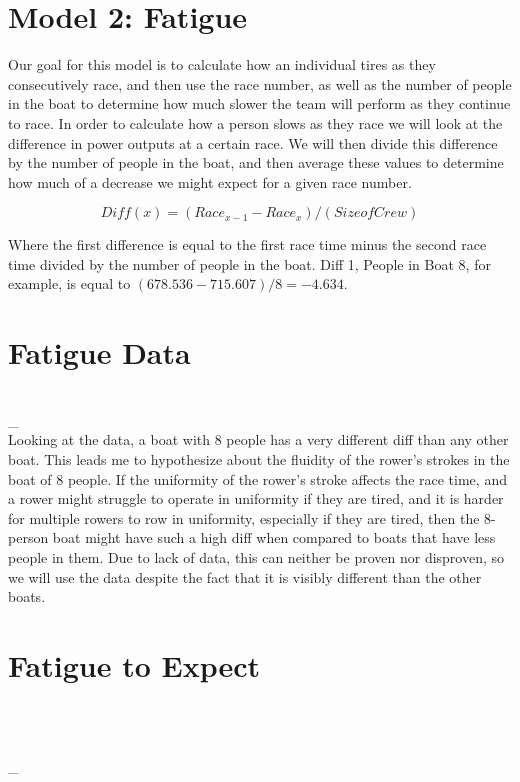 \documentclass[12pt]{article} %
\begin{document}
\section*{Model 2: Fatigue}
Our goal for this model is to calculate how an individual tires as they consecutively race, and then use the race number, as well as the number of people in the boat to determine how much slower the team will perform as they continue to race. In order to calculate how a person slows as they race we will look at the difference in power outputs at a certain race. We will then divide this difference by the number of people in the boat, and then average these values to determine how much of a decrease we might expect for a given race number.

\[Diff(x) = (Race_{x-1}-Race_{x})/(Size of Crew)\]

Where the first difference is equal to the first race time minus the second race time divided by the number of people in the boat. Diff 1, People in Boat 8, for example, is equal to $(678.536-715.607)/8 = -4.634.$

\section*{Fatigue Data}

{\centering
{}
\\}
_
\\

Looking at the data, a boat with 8 people has a very different diff than any other boat. This leads me to hypothesize about the fluidity of the rower's strokes in the boat of 8 people. If the uniformity of the rower's stroke affects the race time, and a rower might struggle to operate in uniformity if they are tired, and it is harder for multiple rowers to row in uniformity, especially if they are tired, then the 8-person boat might have such a high diff when compared to boats that have less people in them. Due to lack of data, this can neither be proven nor disproven, so we will use the data despite the fact that it is visibly different than the other boats.

\section*{Fatigue to Expect }

{\centering
{}
\\}

\\
_
\end{document}
